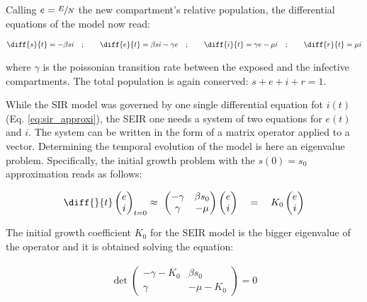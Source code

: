 \documentclass[DIV=12, BCOR=0pt]{scrartcl}  %
\begin{document}
  Calling $e = \sfrac{E}{N}$ the new compartment's relative population, the differential equations of the model now read:
  
  \begin{align}
  	\diff{s}{t} = - \beta s i \quad;  \qquad 	\diff{e}{t} = \beta s i - \gamma e \quad; \qquad \diff{i}{t} = \gamma e - \mu i \quad; \qquad \diff{r}{t} = \mu i
  	\label{eq:seir}
  \end{align}

  where $\gamma$ is the poissonian transition rate between the exposed and the infective compartments. The total population is again conserved: $ s + e + i + r = 1$.
  
  While the SIR model was governed by one single differential equation fot $i(t)$ (Eq. \ref{eq:sir_approxi}), the SEIR one needs a system of two equations for $e(t)$ and $i$.
  The system can be written in the form of a matrix operator applied to a vector. Determining the temporal evolution of the model is here an eigenvalue problem. Specifically, the initial growth problem with the $s(0) = s_0$ approximation reads as follows: 
  
  \begin{align}
  	\diff{}{t}
  	\begin{pmatrix}
  			e \\
  			i
  	\end{pmatrix}_{t=0}
  	\approx \
  	\begin{pmatrix}
  		 - \gamma & \beta s_0\\
  		 \gamma & - \mu
  	\end{pmatrix}
  	\begin{pmatrix}
  		e \\
  		i
  	\end{pmatrix}
	  \quad = \quad K_0 %
	  \begin{pmatrix}
	  	e \\
	  	i
	  \end{pmatrix} %
		\label{eq:seir_approxi}
	\end{align}

The initial growth coefficient $K_0$ for the SEIR model is the bigger eigenvalue of the operator and it is obtained solving the equation: 

	\begin{align}
		\det 
		\begin{pmatrix}
			- \gamma - K_0 & \beta s_0\\ %
			\gamma & - \mu - K_0  %
		\end{pmatrix} = 0
	\label{eq:seir_K0}
	\end{align}
 
\end{document}
